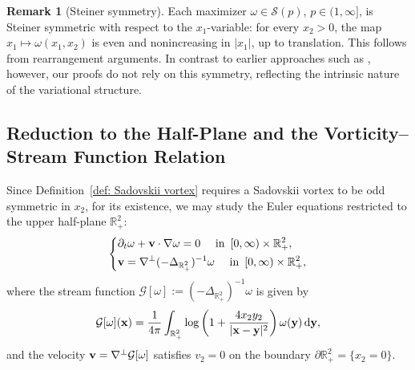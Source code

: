 \documentclass[11pt]{amsart}
\theoremstyle{definition}
\theoremstyle{definition}
\newtheorem{remark}[theorem]{Remark}
\numberwithin{equation}{section}
\newcommand{\0}{\emptyset}
\newcommand{\omg}{\omega}
\newcommand{\bfv}{{\bf v}}
\newcommand{\bfx}{{\bf x}}
\newcommand{\bfy}{{\bf y}}
\newcommand{\bbR}{\mathbb R}
\newcommand{\calG}{\mathcal G}
\newcommand{\calS}{\mathcal S}
\newcommand{\dd}{\mathrm{d}}
\begin{document}
	
\begin{remark}[Steiner symmetry]\label{rmk_Steiner}
Each maximizer $\omega \in \calS(p)$, $p \in (1,\infty]$, is Steiner symmetric with respect to the $x_1$-variable: for every $x_2>0$, the map $x_1 \mapsto \omega(x_1,x_2)$ is even and nonincreasing in $|x_1|$, up to translation. 
This follows from rearrangement arguments. 
In contrast to earlier approaches such as \cite{FT1981, Bur1988, BNL2013, AC2022}, however, our proofs do not rely on this symmetry, reflecting the intrinsic nature of the variational structure.
\end{remark}	
	\subsection{Reduction to the Half-Plane and the Vorticity--Stream Function Relation} \label{subsec_sadovskii}
	
	Since Definition~\ref{def: Sadovskii vortex} requires a Sadovskii vortex to be odd symmetric in $x_{2}$, for its existence, we may study the Euler equations restricted to the upper half-plane $\bbR^2_+$:
	\begin{equation}\label{eq: half Euler eq.}
		\left\{
		\begin{aligned}
			& \partial_{t}\omega + \bfv \cdot \nabla\omg = 0 \quad \mbox{ in } \,  [0,\infty)\times\bbR^2_+,\\
			& \bfv =  \nabla^\perp(-\Delta_{\bbR^2_+})^{-1}\omega \quad \mbox{ in }\, [0,\infty)\times\bbR^2_+,
		\end{aligned}
		\right.
	\end{equation} where the stream function $\calG[\omg]:=(-\Delta_{\bbR^2_+})^{-1}\omg$ is given by
	$$
	\calG[\omg](\bfx)=\frac{1}{4\pi}\int_{\bbR^2_+}\log\left(1+\frac{4x_2y_2}{|\bfx-\bfy|^2}\right)\omg(\bfy) \, \dd\bfy,
	$$
	and the velocity $\bfv=\nabla^\perp\calG[\omg]$ satisfies $v_{2} = 0$ on the boundary $\partial\bbR^2_+ = \{ x_{2} = 0 \}$.
	
\end{document}
